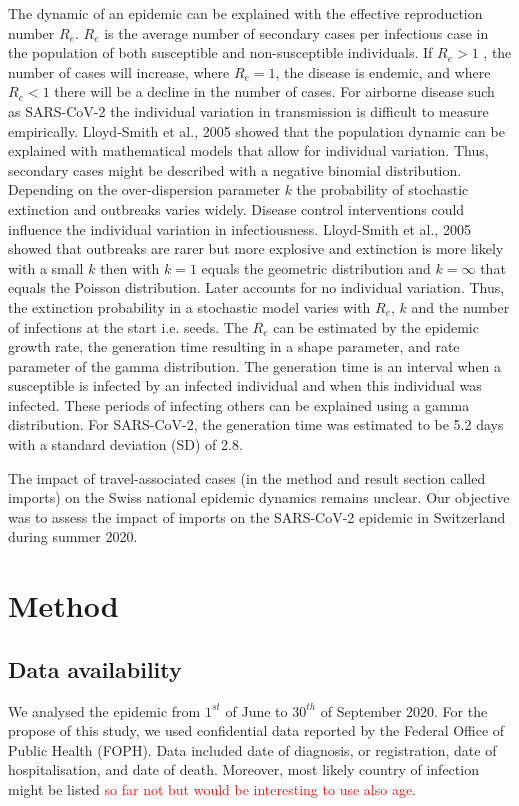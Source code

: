 \documentclass[10pt, a4paper, twoside]{article}
\begin{document}
\begin{multicols}{2}
The dynamic of an epidemic can be explained with the effective reproduction number $R_e$. 
$R_e$ is the average number of secondary cases per infectious case in the population of both susceptible and non-susceptible individuals. 
If $R_e > 1$ , the number of cases will increase, where $R_e = 1$, the disease is endemic, and where $R_e < 1$ there will be a decline in the number of cases. 
For airborne disease such as SARS-CoV-2 the individual variation in transmission is difficult to measure empirically. 
Lloyd-Smith et al., 2005 showed that the population dynamic can be explained with mathematical models that allow for individual variation.\cite{lloyd-smith_superspreading_2005}  
Thus, secondary cases might be described with a negative binomial distribution. Depending on the over-dispersion parameter $k$ the probability of stochastic extinction and outbreaks varies widely. 
Disease control interventions could influence the individual variation in infectiousness.\cite{lloyd-smith_superspreading_2005} 
Lloyd-Smith et al., 2005 showed that outbreaks are rarer but more explosive and extinction is more likely with a small $k$ then with $k = 1$ equals the geometric distribution and $k = \infty$ that equals the Poisson distribution.\cite{lloyd-smith_superspreading_2005} 
Later accounts for no individual variation. 
Thus, the extinction probability in a stochastic model varies with $R_e$, $k$ and the number of infections at the start i.e. seeds. 
The $R_e$ can be estimated by the epidemic growth rate, the generation time resulting in a shape parameter, and rate parameter of the gamma distribution. 
The generation time is an interval when a susceptible is infected by an infected individual and when this individual was infected. These periods of infecting others can be explained using a gamma distribution. 
For SARS-CoV-2, the generation time was estimated to be 5.2 days with a standard deviation (SD) of 2.8.\cite{ganyani_estimating_2020}

The impact of travel-associated cases (in the method and result section called imports) on the Swiss national epidemic dynamics remains unclear. 
Our objective was to assess the impact of imports on the SARS-CoV-2 epidemic in Switzerland during summer 2020.

\section{Method}

\subsection{Data availability}
We analysed the epidemic from $1^{st}$ of June to $30^{th}$ of September 2020. 
For the propose of this study, we used confidential data reported by the Federal Office of Public Health (FOPH). 
Data included date of diagnosis, or registration, date of hospitalisation, and date of death. 
Moreover, most likely country of infection might be listed \textcolor{red}{so far not but would be interesting to use also age}.


\end{multicols}
\end{document}
